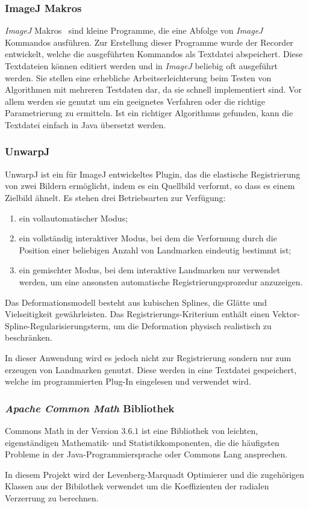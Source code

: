 \subsubsection{ImageJ Makros}	
\textit{ImageJ} Makros~\cite{JMacros} sind kleine Programme, die eine Abfolge von \textit{ImageJ} Kommandos ausführen. Zur Erstellung dieser Programme wurde der Recorder entwickelt, welche die ausgeführten Kommandos als Textdatei abspeichert. Diese Textdateien können editiert werden und in \textit{ImageJ} beliebig oft ausgeführt werden. Sie stellen eine erhebliche Arbeitserleichterung beim Testen von Algorithmen mit mehreren Testdaten dar, da sie schnell implementiert sind. Vor allem werden sie genutzt um ein geeignetes Verfahren oder die richtige Parametrierung zu ermitteln. Ist ein richtiger Algorithmus gefunden, kann die Textdatei einfach in Java übersetzt werden.



\subsubsection{UnwarpJ}

UnwarpJ ist ein für ImageJ entwickeltes Plugin, das die elastische Registrierung von zwei Bildern ermöglicht, indem es ein Quellbild verformt, so dass es einem Zielbild ähnelt. 
Es stehen drei Betriebsarten zur Verfügung: 

\begin{enumerate}
\item ein vollautomatischer Modus; 
\item ein vollständig interaktiver Modus, bei dem die Verformung durch die Position einer beliebigen Anzahl von Landmarken eindeutig bestimmt ist; 
\item ein gemischter Modus, bei dem interaktive Landmarken nur verwendet werden, um eine ansonsten automatische Registrierungsprozedur anzuzeigen.
\end{enumerate}

Das Deformationsmodell besteht aus kubischen Splines, die Glätte und Vielseitigkeit gewährleisten. Das Registrierungs-Kriterium enthält einen Vektor-Spline-Regularisierungsterm, um die Deformation physisch realistisch zu beschränken.\cite{unwrapj}

In dieser Anwendung wird es jedoch nicht zur Registrierung sondern nur zum erzeugen von Landmarken genutzt. Diese werden in eine Textdatei gespeichert, welche im programmierten Plug-In eingelesen und verwendet wird.

\subsubsection{\textit{Apache Common Math} Bibliothek}
Commons Math in der Version $3.6.1$ ist eine Bibliothek von leichten, eigenständigen Mathematik- und Statistikkomponenten, die die häufigsten Probleme in der Java-Programmiersprache oder Commons Lang ansprechen.
\cite{appache}

In diesem Projekt wird der Levenberg-Marquadt Optimierer und die zugehörigen Klassen aus der Bibilothek verwendet um die Koeffizienten der radialen Verzerrung zu berechnen.


